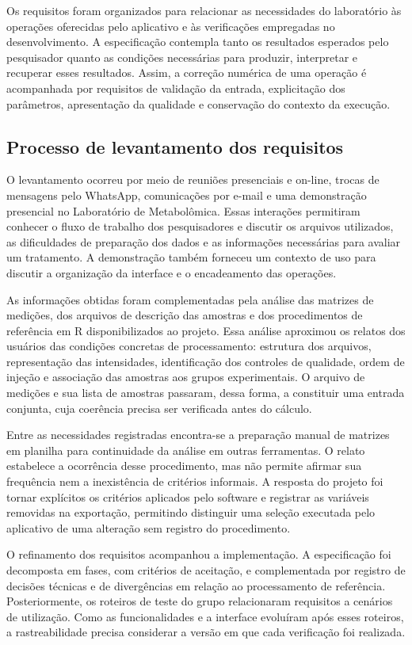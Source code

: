 Os requisitos foram organizados para relacionar as necessidades do laboratório às operações oferecidas pelo aplicativo e às verificações empregadas no desenvolvimento. A especificação contempla tanto os resultados esperados pelo pesquisador quanto as condições necessárias para produzir, interpretar e recuperar esses resultados. Assim, a correção numérica de uma operação é acompanhada por requisitos de validação da entrada, explicitação dos parâmetros, apresentação da qualidade e conservação do contexto da execução.

\subsection{Processo de levantamento dos requisitos}

O levantamento ocorreu por meio de reuniões presenciais e on-line, trocas de mensagens pelo WhatsApp, comunicações por e-mail e uma demonstração presencial no Laboratório de Metabolômica. Essas interações permitiram conhecer o fluxo de trabalho dos pesquisadores e discutir os arquivos utilizados, as dificuldades de preparação dos dados e as informações necessárias para avaliar um tratamento. A demonstração também forneceu um contexto de uso para discutir a organização da interface e o encadeamento das operações.

As informações obtidas foram complementadas pela análise das matrizes de medições, dos arquivos de descrição das amostras e dos procedimentos de referência em R disponibilizados ao projeto. Essa análise aproximou os relatos dos usuários das condições concretas de processamento: estrutura dos arquivos, representação das intensidades, identificação dos controles de qualidade, ordem de injeção e associação das amostras aos grupos experimentais. O arquivo de medições e sua lista de amostras passaram, dessa forma, a constituir uma entrada conjunta, cuja coerência precisa ser verificada antes do cálculo.

Entre as necessidades registradas encontra-se a preparação manual de matrizes em planilha para continuidade da análise em outras ferramentas. O relato estabelece a ocorrência desse procedimento, mas não permite afirmar sua frequência nem a inexistência de critérios informais. A resposta do projeto foi tornar explícitos os critérios aplicados pelo software e registrar as variáveis removidas na exportação, permitindo distinguir uma seleção executada pelo aplicativo de uma alteração sem registro do procedimento.

O refinamento dos requisitos acompanhou a implementação. A especificação foi decomposta em fases, com critérios de aceitação, e complementada por registro de decisões técnicas e de divergências em relação ao processamento de referência. Posteriormente, os roteiros de teste do grupo relacionaram requisitos a cenários de utilização. Como as funcionalidades e a interface evoluíram após esses roteiros, a rastreabilidade precisa considerar a versão em que cada verificação foi realizada.

